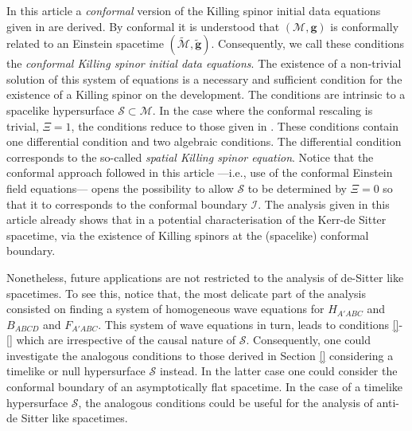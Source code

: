 \documentclass[10pt,a4paper]{article}
\theoremstyle{plain}
\def\bmg{{\bm g}}
\begin{document}
In this article a \emph{conformal} version of the Killing spinor
initial data equations given in \cite{GarVal08c} are derived. By
conformal it is understood that $(\mathcal{M},\bmg)$ is conformally
related to an Einstein spacetime
$(\tilde{\mathcal{M}},\tilde{\bmg})$. Consequently, we call these
conditions the \emph{conformal Killing spinor initial data equations}.
The existence of a non-trivial solution of this system of equations is
a necessary and sufficient condition for the existence of a Killing
spinor on the development. The conditions are intrinsic to a spacelike
hypersurface $\mathcal{S}\subset\mathcal{M}$. In the
case where the conformal rescaling is trivial, $\Xi = 1$, the
conditions reduce to those given in \cite{BaeVal10b}.  These
conditions contain one differential condition and two algebraic
conditions.  The differential condition corresponds to the so-called
\emph{spatial Killing spinor equation}.
Notice that
the conformal approach followed in this article ---i.e., use of the
 conformal Einstein field equations--- opens the
possibility to allow $\mathcal{S}$ to be determined by $\Xi = 0$ so
that it to corresponds to the conformal boundary $\mathscr{I}$. The
analysis given in this article already shows that in a potential
characterisation of the Kerr-de Sitter spacetime, via the existence of
Killing spinors at the (spacelike) conformal boundary.

Nonetheless, future applications are not
restricted to the analysis of de-Sitter like spacetimes. To see this,
notice that, the most delicate part of the analysis consisted on
finding a system of homogeneous wave equations for $H_{A'ABC}$ and
$B_{ABCD}$ and $F_{A'ABC}$. This system of wave equations in turn, leads to
conditions \eqref{}-\eqref{}
which are irrespective of the causal nature of
$\mathcal{S}$. Consequently, one could investigate the analogous
conditions to those derived in Section \ref{}
considering a timelike or null hypersurface $\mathcal{S}$ instead. In
the latter case one could consider the conformal boundary of an
asymptotically flat spacetime. In the case of a timelike hypersurface
$\mathcal{S}$, the analogous conditions could be useful for the
 analysis of anti-de Sitter like spacetimes.
\end{document}
